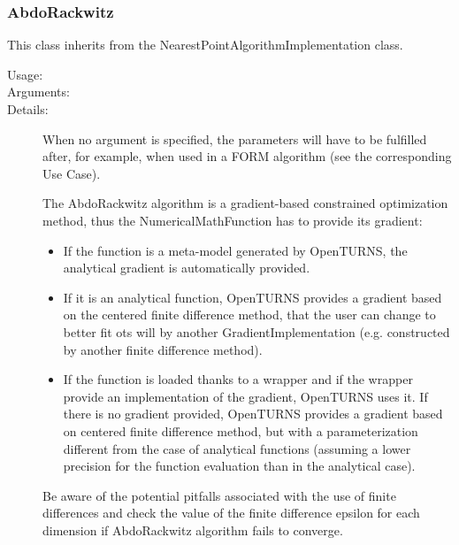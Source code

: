 \subsubsection{AbdoRackwitz}

This class inherits from the NearestPointAlgorithmImplementation class.

\begin{description}
\item[Usage:] \rule{0pt}{1em}

\item[Arguments:]  \rule{0pt}{1em}

\item[Details:]  When no argument is specified, the parameters will have to be fulfilled after, for example, when used in a FORM algorithm (see the corresponding Use Case).

  The AbdoRackwitz algorithm is a gradient-based constrained optimization method, thus the NumericalMathFunction has to provide its gradient:
  \begin{itemize}
  \item If the function is a meta-model generated by OpenTURNS, the analytical gradient is automatically provided.
  \item If it is an analytical function, OpenTURNS provides a gradient based on the centered finite difference method, that the user can change to better fit ots will by another GradientImplementation (e.g. constructed by another finite difference method).
  \item If the function is loaded thanks to a wrapper and if the wrapper provide an implementation of the gradient, OpenTURNS uses it. If there is no gradient provided, OpenTURNS provides a gradient based on centered finite difference method, but with a parameterization different from the case of analytical functions (assuming a lower precision for the function evaluation than in the analytical case).
  \end{itemize}
  Be aware of the potential pitfalls associated with the use of finite differences and check the value of the finite difference epsilon for each dimension if AbdoRackwitz algorithm fails to converge.


\end{description}
